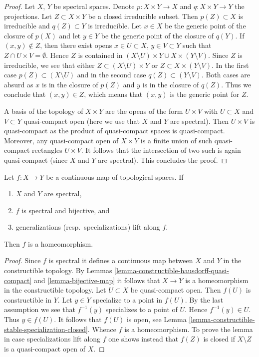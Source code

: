 \begin{proof}
Let $X$, $Y$ be spectral spaces. Denote $p : X \times Y \to X$ and
$q : X \times Y \to Y$ the projections. Let $Z \subset X \times Y$ be a
closed irreducible subset. Then $p(Z) \subset X$ is irreducible
and $q(Z) \subset Y$ is irreducible. Let $x \in X$ be the generic
point of the closure of $p(X)$ and let $y \in Y$ be the generic
point of the closure of $q(Y)$. If $(x, y) \not \in Z$, then
there exist opens $x \in U \subset X$, $y \in V \subset Y$ such
that $Z \cap U \times V = \emptyset$. Hence $Z$ is contained
in $(X \setminus U) \times Y \cup X \times (Y \setminus V)$.
Since $Z$ is irreducible, we see that either
$Z \subset (X \setminus U) \times Y$ or $Z \subset X \times (Y \setminus V)$.
In the first case $p(Z) \subset (X \setminus U)$ and in the
second case $q(Z) \subset (Y \setminus V)$. Both cases are absurd
as $x$ is in the closure of $p(Z)$ and $y$ is in the closure of
$q(Z)$. Thus we conclude that $(x, y) \in Z$, which means that
$(x, y)$ is the generic point for $Z$.

\medskip\noindent
A basis of the topology of $X \times Y$ are the opens of the form
$U \times V$ with $U \subset X$ and $V \subset Y$ quasi-compact open
(here we use that $X$ and $Y$ are spectral). Then $U \times V$ is
quasi-compact as the product of quasi-compact spaces is quasi-compact.
Moreover, any quasi-compact open of $X \times Y$ is a finite union
of such quasi-compact rectangles $U \times V$. It follows that
the intersection of two such is again quasi-compact
(since $X$ and $Y$ are spectral). This concludes the proof.
\end{proof}

\begin{lemma}
\label{lemma-spectral-bijective}
Let $f : X \to Y$ be a continuous map of topological spaces. If
\begin{enumerate}
\item $X$ and $Y$ are spectral,
\item $f$ is spectral and bijective, and
\item generalizations (resp.\ specializations) lift along $f$.
\end{enumerate}
Then $f$ is a homeomorphism.
\end{lemma}

\begin{proof}
Since $f$ is spectral it defines a continuous map between $X$ and $Y$ in
the constructible topology. By
Lemmas \ref{lemma-constructible-hausdorff-quasi-compact} and
\ref{lemma-bijective-map}
it follows that $X \to Y$ is a homeomorphism in the constructible
topology. Let $U \subset X$ be quasi-compact open.
Then $f(U)$ is constructible in $Y$. Let $y \in Y$ specialize
to a point in $f(U)$. By the last assumption we see that $f^{-1}(y)$
specializes to a point of $U$. Hence $f^{-1}(y) \in U$. Thus $y \in f(U)$.
It follows that $f(U)$ is open, see
Lemma \ref{lemma-constructible-stable-specialization-closed}.
Whence $f$ is a homeomorphism.
To prove the lemma in case specializations lift along $f$
one shows instead that $f(Z)$ is closed if $X \setminus Z$ is a
quasi-compact open of $X$.
\end{proof}

